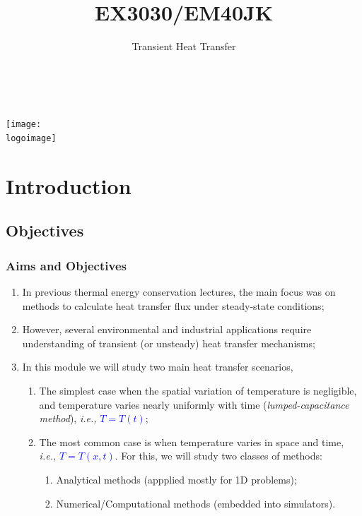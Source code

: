 \documentclass[10pt,compress,unknownkeysallowed]{beamer}
\institute{School of Engineering}
\title{EX3030/EM40JK}
\subtitle{Transient Heat Transfer}
\date[ ]{ }
\author[\shortname]{%
  \fullname\\\ttfamily{\emailaddress}
}
\newcommand{\logoimage}{../FigBanner/UoAHorizBanner}
\newcommand{\ie}{{\it i.e., }}
\newcommand{\blue}{\textcolor{blue}}
\begin{document}
\begin{frame}
  \titlepage
  \vfill%
  \begin{center}
    \texttt{[image: \\logoimage]}
  \end{center}
\end{frame}




\section{Introduction} 


\subsection{Objectives}

\begin{frame}
 \frametitle{Aims and Objectives}
   \begin{enumerate}
     \item<1-> In previous thermal energy conservation lectures, the main focus was on methods to calculate heat transfer flux under steady-state conditions;
     \item<1-> However, several environmental and industrial applications require understanding of transient (or unsteady) heat transfer mechanisms;
     \item<2-> In this module we will study two main heat transfer scenarios,
         \begin{enumerate}
            \item<2-> The simplest case when the spatial variation of temperature is negligible, and temperature varies nearly uniformly with time ({\it lumped-capacitance method}), \ie \blue{$T=T\left(t\right)$};
            \item<3-> The most common case is when temperature varies in space and time, \ie \blue{$T=T\left(x, t\right)$}. For this, we will study two classes of methods:
              \begin{enumerate}
                 \item<4-> Analytical methods (appplied mostly for 1D problems);
                 \item<5-> Numerical/Computational methods (embedded into simulators). 
              \end{enumerate}
         \end{enumerate}
   \end{enumerate}
\end{frame}
\end{document}
